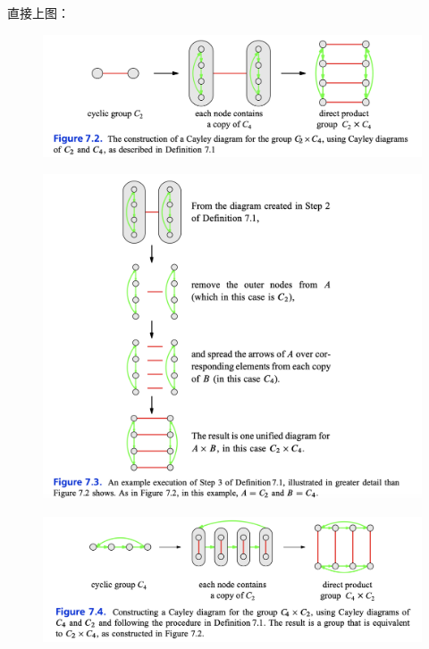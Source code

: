 \documentclass[12pt]{article}
\begin{document}
直接上图：
\begin{figure}[H]
    \centering
    \includegraphics[width=1\textwidth]{fig/Group/Cayley-C2-times-C4.png}
\end{figure}
\begin{figure}[H]
    \centering
    \includegraphics[width=1\textwidth]{fig/Group/Cayley-C2-times-C4-detailed.png}
\end{figure}
\begin{figure}[H]
    \centering
    \includegraphics[width=1\textwidth]{fig/Group/Cayley-C4-times-C2.png}
\end{figure}
\end{document}
